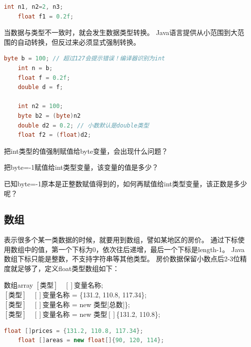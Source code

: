 \begin{lstlisting}[language=java]
	int n1, n2=2, n3;
	float f1 = 0.2f;
\end{lstlisting}


\bigskip
当数据与类型不一致时，就会发生数据类型转换。
Java语言提供从小范围到大范围的自动转换，但反过来必须显式强制转换。

\begin{lstlisting}[language=java]
	byte b = 100; // 超过127会提示错误！编译器识别为int
	int n = b;
	float f = 0.2f;
	double d = f;

	int n2 = 100;
	byte b2 = (byte)n2
	double d2 = 0.2; // 小数默认是double类型
	float f2 = (float)d2;
\end{lstlisting}

\bigskip

\begin{exercise}
	把int类型的值强制赋值给byte变量，会出现什么问题？
\end{exercise}

\begin{exercise}
	把byte=-1赋值给int类型变量，该变量的值是多少？
\end{exercise}

\begin{exercise}
	已知byte=-1原本是正整数赋值得到的，如何再赋值给int类型变量，该正数是多少呢？
\end{exercise}

\subsection{数组}
表示很多个某一类数据的时候，就要用到数组，譬如某地区的房价。
通过下标使用数组中的值，第一个下标为0，依次往后递增，最后一个下标是length-1。
Java数组下标只能是整数，不支持字符串等其他类型。
房价数据保留小数点后2-3位精度就足够了，定义float类型数组如下：

\begin{definition}{数组}{array}
	$[\text{类型}]\quad[]$变量名称;\\
	$[\text{类型}]\quad[]$变量名称 = \{131.2, 110.8, 117.34\};\\
	$[\text{类型}]\quad[]$变量名称 = new 类型$[$总数$]$\};\\
	$[\text{类型}]\quad[]$变量名称 = new 类型$[]$\{131.2, 110.8\};
\end{definition}

\begin{lstlisting}[language=java]
	float []prices = {131.2, 110.8, 117.34};
	float []areas = new float[]{90, 120, 114};
\end{lstlisting}

